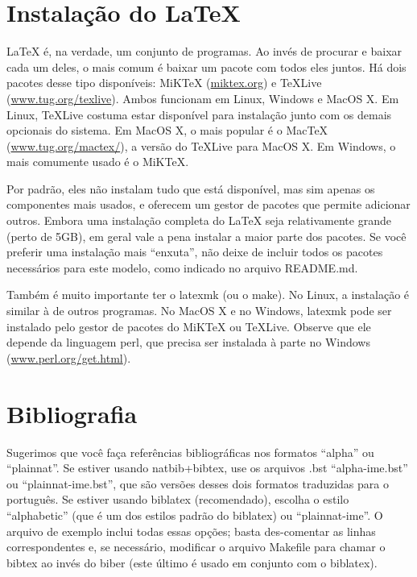 \section{Instalação do \LaTeX{}}

\LaTeX{} é, na verdade, um conjunto de programas. Ao invés de procurar e
baixar cada um deles, o mais comum é baixar um pacote com todos eles juntos.
Há dois pacotes desse tipo disponíveis: MiK\TeX{} (\url{miktex.org}) e
\TeX{}Live (\url{www.tug.org/texlive}). Ambos funcionam em Linux, Windows e
MacOS X. Em Linux, \TeX{}Live costuma estar disponível para instalação junto
com os demais opcionais do sistema. Em MacOS X, o mais popular é o Mac\TeX{}
(\url{www.tug.org/mactex/}), a versão do \TeX{}Live para MacOS X.  Em Windows,
o mais comumente usado é o MiK\TeX{}.

Por padrão, eles não instalam tudo que está disponível, mas sim apenas os
componentes mais usados, e oferecem um gestor de pacotes que permite adicionar
outros. Embora uma instalação completa do \LaTeX{} seja relativamente grande
(perto de 5GB), em geral vale a pena instalar a maior parte dos pacotes. Se
você preferir uma instalação mais ``enxuta'', não deixe de incluir todos os
pacotes necessários para este modelo, como indicado no arquivo README.md.

Também é muito importante ter o \textsf{latexmk} (ou o \textsf{make}). No Linux,
a instalação é similar à de outros programas. No MacOS X e no Windows,
\textsf{latexmk} pode ser instalado pelo gestor de pacotes do MiK\TeX{} ou
\TeX{}Live. Observe que ele depende da linguagem \textsf{perl}, que precisa ser
instalada à parte no Windows (\url{www.perl.org/get.html}).

\section{Bibliografia}

Sugerimos que você faça referências bibliográficas nos formatos ``alpha'' ou
``plainnat''.  Se estiver usando natbib+bibtex,
use os arquivos .bst ``alpha-ime.bst'' ou ``plainnat-ime.bst'', que são
versões desses dois formatos traduzidas para o português. Se estiver usando
biblatex (recomendado), escolha o estilo ``alphabetic''
(que é um dos estilos padrão do biblatex) ou ``plainnat-ime''. O arquivo de
exemplo inclui todas essas opções; basta des-comentar as linhas
correspondentes e, se necessário, modificar o arquivo Makefile para chamar
o bibtex ao invés do biber (este último é usado
em conjunto com o biblatex).

